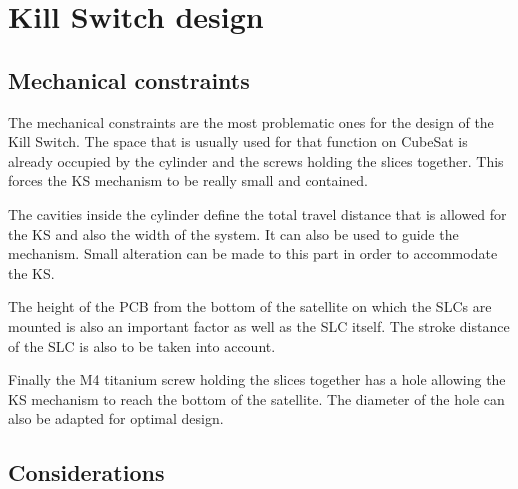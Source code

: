 \section{Kill Switch design}

\subsection{Mechanical constraints}

    The mechanical constraints are the most problematic ones for the design of the Kill Switch. The space that is usually used for that function on CubeSat is already occupied by the cylinder and the screws holding the slices together. This forces the KS mechanism to be really small and contained.

    The cavities inside the cylinder define the total travel distance that is allowed for the KS and also the width of the system. It can also be used to guide the mechanism. Small alteration can be made to this part in order to accommodate the KS.

    The height of the PCB from the bottom of the satellite on which the SLCs are mounted is also an important factor as well as the SLC itself. The stroke distance of the SLC is also to be taken into account.

    Finally the M4 titanium screw holding the slices together has a hole allowing the KS mechanism to reach the bottom of the satellite. The diameter of the hole can also be adapted for optimal design.

\subsection{Considerations}



